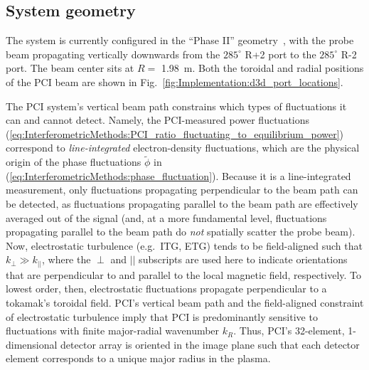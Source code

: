 \subsection{System geometry}
The system is currently configured
in the ``Phase II'' geometry~\cite{dorris_rsi09},
with the probe beam propagating vertically downwards
from the $285^{\circ}$ R+2 port to the $285^{\circ}$ R-2 port.
The beam center sits at $R = $ \SI{1.98}{\meter}.
Both the toroidal and radial positions
of the PCI beam are shown in
Fig.~\ref{fig:Implementation:d3d_port_locations}.

The PCI system's vertical beam path constrains
which types of fluctuations it can and cannot detect.
Namely, the PCI-measured power fluctuations
(\ref{eq:InterferometricMethods:PCI_ratio_fluctuating_to_equilibrium_power})
correspond to \emph{line-integrated} electron-density fluctuations, which
are the physical origin of the phase fluctuations $\tilde{\phi}$ in
(\ref{eq:InterferometricMethods:phase_fluctuation}).
Because it is a line-integrated measurement,
only fluctuations propagating perpendicular to the beam path can be detected,
as fluctuations propagating parallel to the beam path
are effectively averaged out of the signal
\graffito{\textcolor{red}{what about $\delta \omega$?}}
(and, at a more fundamental level, fluctuations propagating
parallel to the beam path do \emph{not} spatially scatter the probe beam).
\graffito{\textcolor{red}{citation? Wesson?}}
Now, electrostatic turbulence (e.g.\ ITG, ETG) tends to be field-aligned
such that $k_{\perp} \gg k_{||}$, where
the $\perp$ and $||$ subscripts are used here to indicate
orientations that are perpendicular to and parallel to
the local magnetic field, respectively.
To lowest order, then, electrostatic fluctuations propagate
perpendicular to a tokamak's toroidal field.
PCI's vertical beam path and
the field-aligned constraint of electrostatic turbulence
imply that PCI is predominantly sensitive to fluctuations
with finite major-radial wavenumber $k_R$.
Thus, PCI's 32-element, 1-dimensional detector array
is oriented in the image plane such that
each detector element corresponds to a unique major radius in the plasma.


